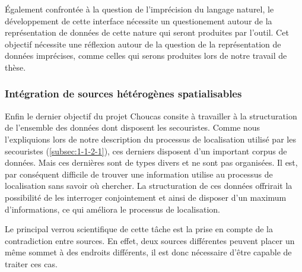 Également confrontée à la question de l'imprécision du langage
naturel, le développement de cette interface nécessite un
questionement autour de la représentation de données de cette nature
qui seront produites par l'outil. Cet objectif nécessite une réflexion
autour de la question de la représentation de données imprécises,
comme celles qui serons produites lors de notre travail de thèse.

\subsubsection{Intégration de sources hétérogènes spatialisables}

Enfin le dernier objectif du projet Choucas consite à travailler à la
structuration de l'ensemble des données dont disposent les
secouristes. Comme nous l'expliquions lors de notre description du
processus de localisation utilisé par les secouristes
(\ref{subsec:1-1-2-1}), ces derniers disposent d'un important corpus
de données. Mais ces dernières sont de types divers et ne sont pas
organisées. Il est, par conséquent difficile de trouver une
information utilise au processus de localisation sans savoir où
chercher. La structuration de ces données offrirait la possibilité de
les interroger conjointement et ainsi de disposer d'un maximum
d'informations, ce qui améliora le processus de localisation.

Le principal verrou scientifique de cette tâche est la prise en compte
de la contradiction entre sources. En effet, deux sources différentes
peuvent placer un même sommet à des endroits différents, il est donc
nécessaire d'être capable de traiter ces cas.


